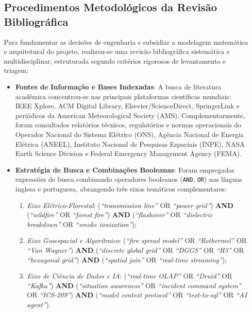 \subsection{Procedimentos Metodológicos da Revisão Bibliográfica}
\label{sbc:metodologia_revisao}

Para fundamentar as decisões de engenharia e subsidiar a modelagem matemática e arquitetural do projeto, realizou-se uma revisão bibliográfica sistemática e multidisciplinar, estruturada segundo critérios rigorosos de levantamento e triagem:

\begin{itemize}
    \item \textbf{Fontes de Informação e Bases Indexadas}: A busca de literatura acadêmica concentrou-se nas principais plataformas científicas mundiais: IEEE Xplore, ACM Digital Library, Elsevier/ScienceDirect, SpringerLink e periódicos da American Meteorological Society (AMS). Complementarmente, foram consultados relatórios técnicos, regulatórios e normas operacionais do Operador Nacional do Sistema Elétrico (ONS), Agência Nacional de Energia Elétrica (ANEEL), Instituto Nacional de Pesquisas Espaciais (INPE), NASA Earth Science Division e Federal Emergency Management Agency (FEMA).
    \item \textbf{Estratégia de Busca e Combinações Booleanas}: Foram empregadas expressões de busca combinando operadores booleanos (\texttt{AND}, \texttt{OR}) nas línguas inglesa e portuguesa, abrangendo três eixos temáticos complementares:
    \begin{enumerate}
        \item \textit{Eixo Elétrico-Florestal}: (\textit{``transmission line''} OR \textit{``power grid''}) \textbf{AND} (\textit{``wildfire''} OR \textit{``forest fire''}) \textbf{AND} (\textit{``flashover''} OR \textit{``dielectric breakdown''} OR \textit{``smoke ionization''});
        \item \textit{Eixo Geoespacial e Algorítmico}: (\textit{``fire spread model''} OR \textit{``Rothermel''} OR \textit{``Van Wagner''}) \textbf{AND} (\textit{``discrete global grid''} OR \textit{``DGGS''} OR \textit{``H3''} OR \textit{``hexagonal grid''}) \textbf{AND} (\textit{``spatial join''} OR \textit{``real-time streaming''});
        \item \textit{Eixo de Ciência de Dados e IA}: (\textit{``real-time OLAP''} OR \textit{``Druid''} OR \textit{``Kafka''}) \textbf{AND} (\textit{``situation awareness''} OR \textit{``incident command system''} OR \textit{``ICS-209''}) \textbf{AND} (\textit{``model context protocol''} OR \textit{``text-to-sql''} OR \textit{``AI agent''}).

\end{enumerate}
\end{itemize}
